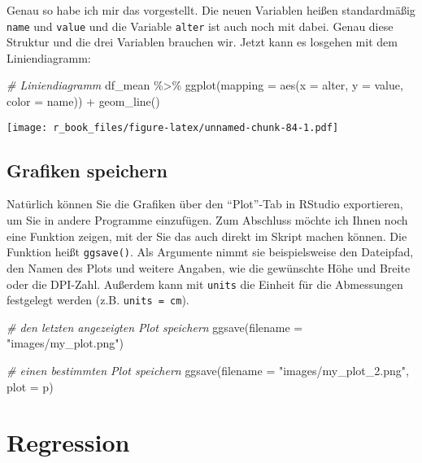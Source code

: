 \documentclass[
]{book}
\newenvironment{Shaded}{\begin{snugshade}}{\end{snugshade}}
\newcommand{\AttributeTok}[1]{\textcolor[rgb]{0.77,0.63,0.00}{#1}}
\newcommand{\CommentTok}[1]{\textcolor[rgb]{0.56,0.35,0.01}{\textit{#1}}}
\newcommand{\FunctionTok}[1]{\textcolor[rgb]{0.00,0.00,0.00}{#1}}
\newcommand{\NormalTok}[1]{#1}
\newcommand{\SpecialCharTok}[1]{\textcolor[rgb]{0.00,0.00,0.00}{#1}}
\newcommand{\StringTok}[1]{\textcolor[rgb]{0.31,0.60,0.02}{#1}}
\begin{document}
Genau so habe ich mir das vorgestellt. Die neuen Variablen heißen standardmäßig \texttt{name} und \texttt{value} und die Variable \texttt{alter} ist auch noch mit dabei. Genau diese Struktur und die drei Variablen brauchen wir. Jetzt kann es losgehen mit dem Liniendiagramm:

\begin{Shaded}
\begin{Highlighting}[]
\CommentTok{\# Liniendiagramm}
\NormalTok{df\_mean }\SpecialCharTok{\%\textgreater{}\%} 
  \FunctionTok{ggplot}\NormalTok{(}\AttributeTok{mapping =} \FunctionTok{aes}\NormalTok{(}\AttributeTok{x =}\NormalTok{ alter, }\AttributeTok{y =}\NormalTok{ value, }\AttributeTok{color =}\NormalTok{ name)) }\SpecialCharTok{+} 
  \FunctionTok{geom\_line}\NormalTok{()}
\end{Highlighting}
\end{Shaded}

\texttt{[image: r\_book\_files/figure-latex/unnamed-chunk-84-1.pdf]}

\hypertarget{grafiken-speichern}{%
\section{Grafiken speichern}\label{grafiken-speichern}}

Natürlich können Sie die Grafiken über den ``Plot''-Tab in RStudio exportieren, um Sie in andere Programme einzufügen. Zum Abschluss möchte ich Ihnen noch eine Funktion zeigen, mit der Sie das auch direkt im Skript machen können. Die Funktion heißt \texttt{ggsave()}. Als Argumente nimmt sie beispielsweise den Dateipfad, den Namen des Plots und weitere Angaben, wie die gewünschte Höhe und Breite oder die DPI-Zahl. Außerdem kann mit \texttt{units} die Einheit für die Abmessungen festgelegt werden (z.B. \texttt{units\ =\ cm}).

\begin{Shaded}
\begin{Highlighting}[]
\CommentTok{\# den letzten angezeigten Plot speichern}
\FunctionTok{ggsave}\NormalTok{(}\AttributeTok{filename =} \StringTok{"images/my\_plot.png"}\NormalTok{)}

\CommentTok{\# einen bestimmten Plot speichern}
\FunctionTok{ggsave}\NormalTok{(}\AttributeTok{filename =} \StringTok{"images/my\_plot\_2.png"}\NormalTok{,}
       \AttributeTok{plot =}\NormalTok{ p)}
\end{Highlighting}
\end{Shaded}

\hypertarget{regression}{%
\chapter{Regression}\label{regression}}
\end{document}
